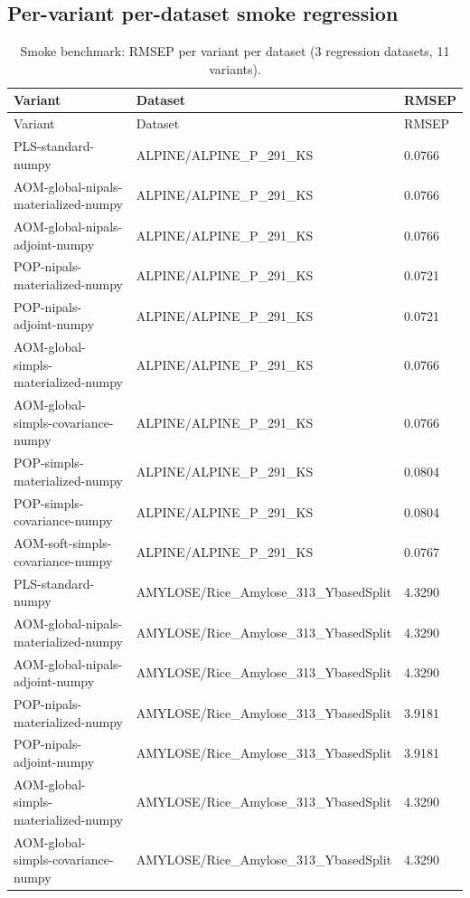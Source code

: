 \documentclass[a4paper,11pt]{article}
\begin{document}
\subsection{Per-variant per-dataset smoke regression}
\begin{longtable}{lll}
\caption{Smoke benchmark: RMSEP per variant per dataset (3 regression
datasets, 11 variants).}\\
\toprule
Variant & Dataset & RMSEP \\
\midrule
\endfirsthead
\toprule
Variant & Dataset & RMSEP \\
\midrule
\endhead
\bottomrule
\endfoot
PLS-standard-numpy & ALPINE/ALPINE\_P\_291\_KS & 0.0766 \\
AOM-global-nipals-materialized-numpy & ALPINE/ALPINE\_P\_291\_KS & 0.0766 \\
AOM-global-nipals-adjoint-numpy & ALPINE/ALPINE\_P\_291\_KS & 0.0766 \\
POP-nipals-materialized-numpy & ALPINE/ALPINE\_P\_291\_KS & 0.0721 \\
POP-nipals-adjoint-numpy & ALPINE/ALPINE\_P\_291\_KS & 0.0721 \\
AOM-global-simpls-materialized-numpy & ALPINE/ALPINE\_P\_291\_KS & 0.0766 \\
AOM-global-simpls-covariance-numpy & ALPINE/ALPINE\_P\_291\_KS & 0.0766 \\
POP-simpls-materialized-numpy & ALPINE/ALPINE\_P\_291\_KS & 0.0804 \\
POP-simpls-covariance-numpy & ALPINE/ALPINE\_P\_291\_KS & 0.0804 \\
AOM-soft-simpls-covariance-numpy & ALPINE/ALPINE\_P\_291\_KS & 0.0767 \\
PLS-standard-numpy & AMYLOSE/Rice\_Amylose\_313\_YbasedSplit & 4.3290 \\
AOM-global-nipals-materialized-numpy & AMYLOSE/Rice\_Amylose\_313\_YbasedSplit & 4.3290 \\
AOM-global-nipals-adjoint-numpy & AMYLOSE/Rice\_Amylose\_313\_YbasedSplit & 4.3290 \\
POP-nipals-materialized-numpy & AMYLOSE/Rice\_Amylose\_313\_YbasedSplit & 3.9181 \\
POP-nipals-adjoint-numpy & AMYLOSE/Rice\_Amylose\_313\_YbasedSplit & 3.9181 \\
AOM-global-simpls-materialized-numpy & AMYLOSE/Rice\_Amylose\_313\_YbasedSplit & 4.3290 \\
AOM-global-simpls-covariance-numpy & AMYLOSE/Rice\_Amylose\_313\_YbasedSplit & 4.3290 \\

\end{longtable}
\end{document}
